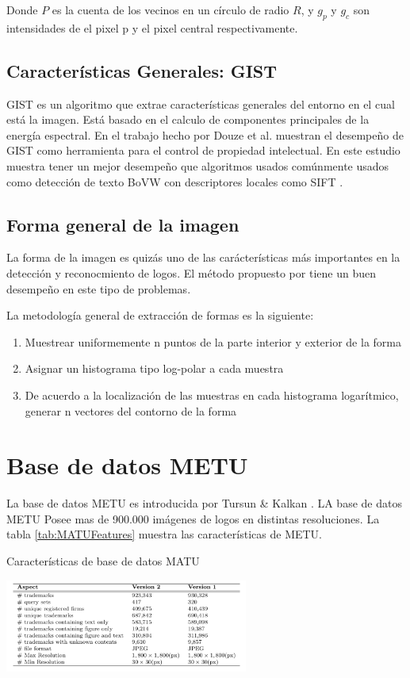 \documentclass[conference]{IEEEtran}
\begin{document}
Donde $P$ es la cuenta de los vecinos en un círculo de radio $R$, y $g_p$ y $g_c$ son intensidades de el pixel p y el pixel central respectivamente.

\subsection{Características Generales: GIST}
GIST es un algoritmo que extrae características generales del entorno en el cual está la imagen. Está basado en el calculo de componentes principales de la energía espectral. En el trabajo hecho por Douze et al. \cite{GIST} muestran el desempeño de GIST como herramienta para el control de propiedad intelectual. En este estudio muestra tener un mejor desempeño que algoritmos usados comúnmente usados como detección de texto BoVW \cite{bowd} con descriptores locales como SIFT \cite{kpoint}.



\subsection{Forma general de la imagen}

La forma de la imagen es quizás uno de las carácterísticas más importantes en la detección y reconocmiento de logos. El método propuesto por \cite{shape} tiene un buen desempeño en este tipo de problemas.

La metodología general de extracción de formas es la siguiente:

\begin{enumerate}
\item{Muestrear uniformemente n puntos de la parte interior y exterior de la forma}

\item{Asignar un histograma tipo log-polar a cada muestra}

\item{De acuerdo a la localización de las muestras en cada histograma logarítmico, generar n vectores del contorno de la forma}
\end{enumerate}


\section{Base de datos METU}
La base de datos METU es introducida por Tursun \& Kalkan \cite{metuV1}. LA base de datos METU Posee mas de 900.000 imágenes de logos en distintas resoluciones. La tabla \ref{tab:MATUFeatures} muestra las características de METU.
\begin{table}[h!]
	\caption{Características de base de datos MATU}
	\includegraphics[width=8cm]{images/caracteristicasMatu}
	\label{tab:MATUFeatures}
\end{table}
\end{document}

